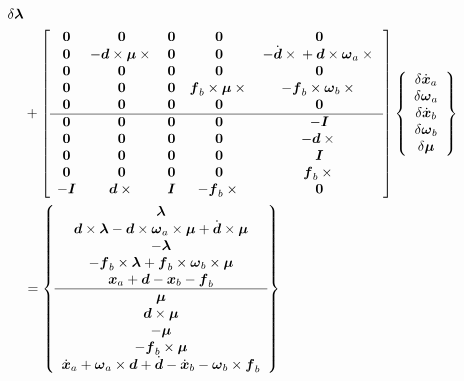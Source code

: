 \documentclass[10pt,dvips,fleqn]{report}
\newcommand{\T}[1]{\boldsymbol{#1}}
\begin{document}
\begin{align}
{{		\delta\T{\lambda}
	}} \nonumber \\
	&+ \sqbr{\matr{ccccc}{
		\T{0} & \T{0} & \T{0} & \T{0} & \T{0} \\ 	%
		\T{0} & -\T{d}\times\T{\mu}\times{} &
			\T{0} & \T{0} & 
			- \dot{\T{d}}\times{}
			+ \T{d}\times\T{\omega}_a\times{} \\	%
		\T{0} & \T{0} & \T{0} & \T{0} & \T{0} \\	%
		\T{0} & \T{0} & \T{0} & \T{f}_b\times\T{\mu}\times{} &
			-\T{f}_b\times\T{\omega}_b\times{} \\	%
		\T{0} & \T{0} & \T{0} & \T{0} & \T{0} \\	%
%
	\hline
		\T{0} & \T{0} & \T{0} & \T{0} & -\T{I} \\	%
		\T{0} & \T{0} &
			\T{0} & \T{0} & -\T{d}\times{} \\	%
		\T{0} & \T{0} & \T{0} & \T{0} & \T{I} \\	%
		\T{0} & \T{0} & \T{0} & \T{0} &
			\T{f}_b\times{} \\	%
		-\T{I} & \T{d}\times{} & \T{I} & -\T{f}_b\times{} &
			\T{0} 					%
	}} \cubr{\cvvect{
		\delta\dot{\T{x}}_a \\
		\delta\T{\omega}_a \\
		\delta\dot{\T{x}}_b \\
		\delta\T{\omega}_b \\
		\delta\T{\mu}
	}} \nonumber \\
	&= \cubr{\cvvect{
		\T{\lambda} \\
		\T{d}\times\T{\lambda}
			- \T{d}\times\T{\omega}_a\times\T{\mu}
			+ \dot{\T{d}}\times\T{\mu} \\
		-\T{\lambda} \\
		-\T{f}_b\times\T{\lambda}
			+ \T{f}_b\times\T{\omega}_b\times\T{\mu} \\
		\T{x}_a + \T{d} - \T{x}_b - \T{f}_b \\
%
		\hline
		\T{\mu} \\
		\T{d}\times\T{\mu} \\
		-\T{\mu} \\
		-\T{f}_b\times\T{\mu} \\
		\dot{\T{x}}_a + \T{\omega}_a\times\T{d} + \dot{\T{d}}
			- \dot{\T{x}}_b - \T{\omega}_b\times\T{f}_b
	}}
\end{align}
\end{document}

